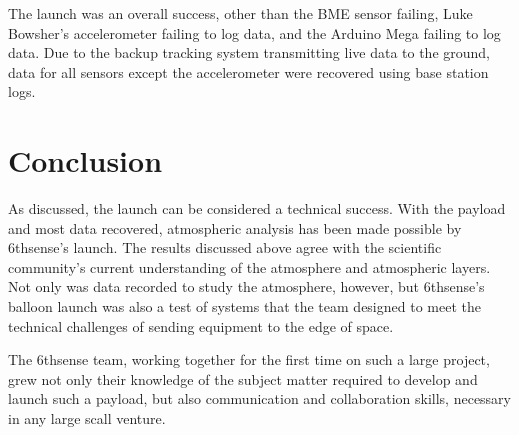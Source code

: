 \documentclass[12pt,]{article}
\begin{document}
The launch was an overall success, other than the BME sensor failing,
Luke Bowsher's accelerometer failing to log data, and the Arduino Mega
failing to log data. Due to the backup tracking system transmitting live
data to the ground, data for all sensors except the accelerometer were
recovered using base station logs.

\section{Conclusion}\label{conclusion}

As discussed, the launch can be considered a technical success. With the
payload and most data recovered, atmospheric analysis has been made
possible by 6thsense's launch. The results discussed above agree with
the scientific community's current understanding of the atmosphere and
atmospheric layers. Not only was data recorded to study the atmosphere,
however, but 6thsense's balloon launch was also a test of systems that
the team designed to meet the technical challenges of sending equipment
to the edge of space.

The 6thsense team, working together for the first time on such a large
project, grew not only their knowledge of the subject matter required to
develop and launch such a payload, but also communication and
collaboration skills, necessary in any large scall venture.
\end{document}

